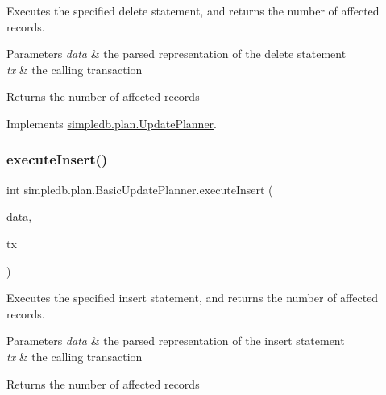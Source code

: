 Executes the specified delete statement, and returns the number of affected records. 
\begin{DoxyParams}{Parameters}
{\em data} & the parsed representation of the delete statement \\
\hline
{\em tx} & the calling transaction \\
\hline
\end{DoxyParams}
\begin{DoxyReturn}{Returns}
the number of affected records 
\end{DoxyReturn}


Implements \hyperlink{interfacesimpledb_1_1plan_1_1UpdatePlanner_a7141a96cb092881cc149f0804bbafc20}{simpledb.\+plan.\+Update\+Planner}.

\mbox{\label{classsimpledb_1_1plan_1_1BasicUpdatePlanner_a8c1ed83755ef7d71adab3590b3d995fa}} 
\subsubsection{\texorpdfstring{execute\+Insert()}{executeInsert()}}
{\footnotesize\ttfamily int simpledb.\+plan.\+Basic\+Update\+Planner.\+execute\+Insert (\begin{DoxyParamCaption}\item[{\hyperlink{classsimpledb_1_1parse_1_1InsertData}{Insert\+Data}}]{data,  }\item[{\hyperlink{classsimpledb_1_1tx_1_1Transaction}{Transaction}}]{tx }\end{DoxyParamCaption})\hspace{0.3cm}{\ttfamily [inline]}}

Executes the specified insert statement, and returns the number of affected records. 
\begin{DoxyParams}{Parameters}
{\em data} & the parsed representation of the insert statement \\
\hline
{\em tx} & the calling transaction \\
\hline
\end{DoxyParams}
\begin{DoxyReturn}{Returns}
the number of affected records 
\end{DoxyReturn}


